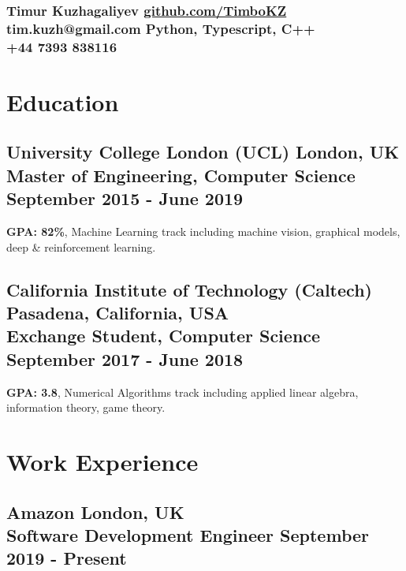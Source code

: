 \documentclass{article}
\begin{document}
\subsubsection*{{\Huge Timur Kuzhagaliyev} \hfill \href{https://github.com/TimboKZ}{github.com/TimboKZ} \\ tim.kuzh@gmail.com \hfill Python, Typescript, C++ \\ +44 7393 838116}

\section*{Education}

\subsection*{University College London \textcolor{SubtleText}{\normalfont (UCL)} \hfill \textcolor{CompanyLocationText}{London, UK} \\ \colorbox{RoleBackground}{Master of Engineering, Computer Science} \hfill September 2015 - June 2019}

\textbf{GPA: 82\%}, Machine Learning track including machine vision, graphical models, deep \& reinforcement learning.

\subsection*{California Institute of Technology \textcolor{SubtleText}{\normalfont (Caltech)} \hfill \textcolor{CompanyLocationText}{Pasadena, California, USA} \\ \colorbox{RoleBackground}{Exchange Student, Computer Science} \hfill September 2017 - June 2018}

\textbf{GPA: 3.8}, Numerical Algorithms track including applied linear algebra, information theory, game theory.

\section*{Work Experience}

\subsection*{Amazon \hfill \textcolor{CompanyLocationText}{London, UK} \\ \colorbox{RoleBackground}{Software Development Engineer} \hfill September 2019 - Present}
\end{document}

